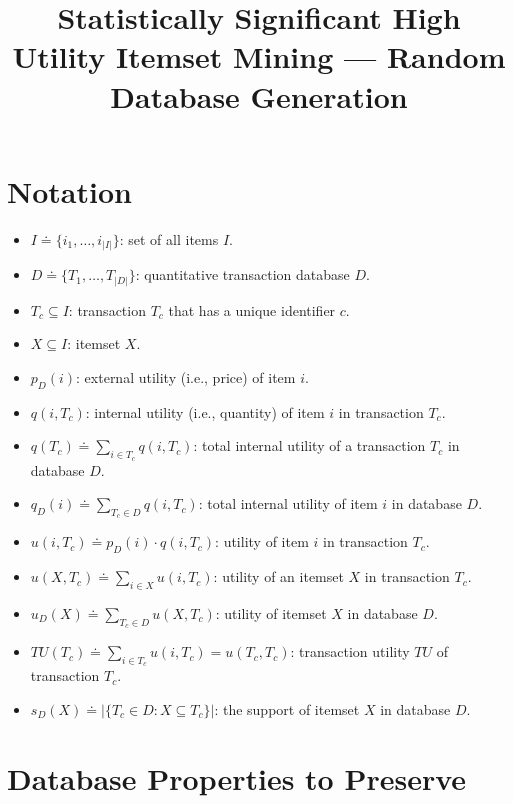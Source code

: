 \documentclass{article}
\title{Statistically Significant High Utility Itemset Mining --- Random
Database Generation}
\date{}
\author{}
\begin{document}
\maketitle

\section{Notation}

\begin{itemize}
    \item $I \doteq \{i_1, \dots, i_{|I|}\}$: set of all items $I$.
    \item $D \doteq \{T_1, \dots, T_{|D|}\}$: quantitative transaction database
        $D$.
    \item $T_c \subseteq I$: transaction $T_c$ that has a unique identifier
        $c$.
    \item $X \subseteq I$: itemset $X$.
    \item $p_D(i)$: external utility (i.e., price) of item $i$.
    \item $q(i, T_c)$: internal utility (i.e., quantity) of item $i$ in
        transaction $T_c$.
    \item $q(T_c) \doteq \sum_{i \in T_c} q(i, T_c)$: total internal utility of
        a transaction $T_c$ in database $D$.
    \item $q_D(i) \doteq \sum_{T_c \in D} q(i, T_c)$: total internal utility of
        item $i$ in database $D$.
    \item $u(i, T_c) \doteq p_D(i) \cdot q(i, T_c) $: utility of item $i$ in
        transaction $T_c$.
    \item $u(X, T_c) \doteq \sum_{i \in X} u(i, T_c)$: utility of an itemset
        $X$ in transaction $T_c$.
    \item $u_D(X) \doteq \sum_{T_c \in D} u(X, T_c)$: utility of itemset $X$ in
        database $D$.
    \item $TU(T_c) \doteq \sum_{i \in T_c} u(i, T_c) = u(T_c, T_c)$:
        transaction utility $TU$ of transaction $T_c$.
    \item $s_D(X) \doteq |\{T_c \in D : X \subseteq T_c\}|$: the support of
        itemset $X$ in database $D$.
\end{itemize}

\section{Database Properties to Preserve}
\end{document}
